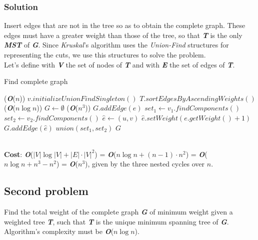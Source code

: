 \documentclass[11pt]{article}
\begin{document}
\subsubsection*{Solution}
Insert edges that are not in the tree so as to obtain the complete graph. These edges must have a greater weight than those of the tree, so that \textbf{\textit{T}} is the only \textbf{\textit{MST}} of \textbf{\textit{G}}. Since \textit{Kruskal}'s algorithm uses the \textit{Union-Find} structures for representing the cuts, we use this structures to solve the problem. \\
Let's define with \textbf{\textit{V}} the set of nodes of \textbf{\textit{T}} and with \textbf{\textit{E}} the set of edges of \textbf{\textit{T}}.
\begin{algorithm}
	\caption{Find complete graph}\label{euclid}
	\begin{algorithmic}[1]
		 \qquad \qquad \qquad \qquad \qquad \qquad \qquad \qquad \qquad \qquad \qquad \qquad (\textbf{\textit{O}}($n$))
			\State $v.initializeUnionFindSingleton()$
		\EndFor
		\State $T.sortEdgesByAscendingWeights()$ \qquad \qquad \qquad \qquad \qquad \qquad \qquad (\textbf{\textit{O}}($n\log{n}$))
		\State $G \gets \emptyset$
		 \qquad \qquad \qquad \qquad \qquad \qquad \qquad \qquad \qquad \qquad (\textbf{\textit{O}}($n^3$))
			\State  $G.addEdge(e)$
			\State  $set_1 \gets v_1.findComponents()$
			\State  $set_2 \gets v_2.findComponents()$
					\State $\hat{e} \gets (u, v)$
						\State $\hat{e}.setWeight(e.getWeight() + 1)$
						\State $G.addEdge(\hat{e})$
					\EndIf
				\EndFor
			\EndFor
			\State $union(set_1, set_2)$
		\EndFor
		\State \Return $G$
	\end{algorithmic}
\end{algorithm} \\
\textbf{Cost}: \textbf{\textit{O}}($|V|\log{|V|} + |E| \cdot |V|^2$) = \textbf{\textit{O}}($n\log{n} + (n-1) \cdot n^2$) = \textbf{\textit{O}}($n\log{n} + n^3 - n^2$) = \textbf{\textit{O}}($n^3$), given by the three nested cycles over $n$.
\subsection*{Second problem}
Find the total weight of the complete graph \textbf{\textit{G}} of minimum weight given a weighted tree \textbf{\textit{T}}, such that  \textbf{\textit{T}} is the unique minimum spanning tree of \textbf{\textit{G}}. Algorithm's complexity must be \textbf{\textit{O}}($n \log{n}$).
\end{document}
